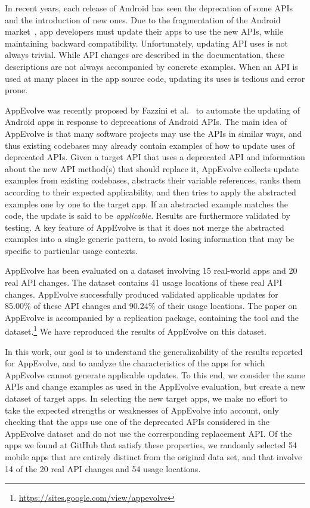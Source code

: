 In recent years, each release of Android has seen the deprecation of some
APIs and the introduction of new ones.  Due to the fragmentation of the
Android market~\cite{he2018understanding,li2018cid}, app developers must
update their apps to use the new APIs, while maintaining backward
compatibility.  Unfortunately, updating API uses is not always trivial.
While API changes are described in the documentation, these descriptions
are not always accompanied by concrete examples.  When an API is used at
many places in the app source code, updating its uses is tedious and
error prone.

AppEvolve was recently proposed by Fazzini et
al.~\cite{fazzini2019automated} to automate the updating of Android apps in
response to deprecations of Android APIs.  The main idea of AppEvolve is
that many software projects may use the APIs in similar ways, and thus
existing codebases may already contain examples of how to update uses of
deprecated APIs.  Given a target API that uses a deprecated API and
information about the new API method(s) that should replace it, AppEvolve
collects update examples from existing codebases, abstracts their variable
references, ranks them according to their expected applicability, and then
tries to apply the abstracted examples one by one to the target app.  If an
abstracted example matches the code, the update is said to be {\em
applicable}.  Results are furthermore validated by testing.  A key feature
of AppEvolve is that it does not merge the abstracted examples into a
single generic pattern, to avoid losing information that may be specific to
particular usage contexts.

AppEvolve has been evaluated on a dataset involving 15 real-world apps and
20 real API changes. The dataset contains 41 usage locations of these real
 API changes. AppEvolve successfully produced validated applicable updates
for 85.00\% of these API changes and 90.24\% of their usage locations.  The
paper on AppEvolve is accompanied by a replication package, containing the
tool and the
dataset.\footnote{\url{https://sites.google.com/view/appevolve}} We have
reproduced the results of AppEvolve on this dataset.

In this work, our goal is to understand the generalizability of the results
reported for AppEvolve, and to analyze the characteristics of the apps for
which AppEvolve cannot generate applicable updates.  To this end, we
consider the same APIs and change examples as used in the AppEvolve
evaluation, but create a new dataset of target apps.  In selecting the new
target apps, we make no effort to take the expected strengths or weaknesses
of AppEvolve into account, only checking that the apps use one of the
deprecated APIs considered in the AppEvolve dataset and do not use the
corresponding replacement API.  Of the apps we found at GitHub that satisfy
these properties, we randomly selected 54 mobile apps that are entirely
distinct from the original data set, and that involve 14 of the 20 real API
changes and 54 usage locations.

